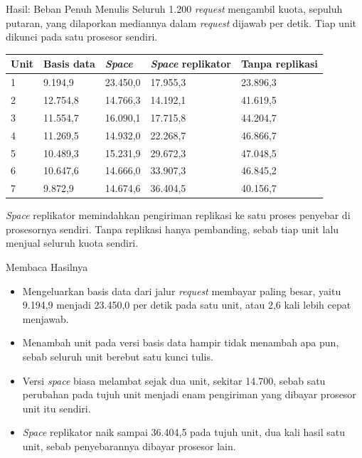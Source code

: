 \documentclass[aspectratio=169, table, 12pt]{beamer}
\begin{document}
\begin{frame}{{\Large Hasil: Beban Penuh Menulis}}
  \vspace{4pt}
  {\small Seluruh 1.200 \textit{request} mengambil kuota, sepuluh putaran, yang
  dilaporkan mediannya dalam \textit{request} dijawab per detik. Tiap unit
  dikunci pada satu prosesor sendiri.}

  \vspace{2pt}
  \centering
  \footnotesize
  \begin{tabularx}{0.96\textwidth}{|l|X|X|X|X|}
    \hline
    \textbf{Unit} & \textbf{Basis data} & \textbf{\textit{Space}} & \textbf{\textit{Space} replikator} & \textbf{Tanpa replikasi} \\
    \hline
    1 & 9.194,9 & 23.450,0 & 17.955,3 & 23.896,3 \\
    \hline
    2 & 12.754,8 & 14.766,3 & 14.192,1 & 41.619,5 \\
    \hline
    3 & 11.554,7 & 16.090,1 & 17.715,8 & 44.204,7 \\
    \hline
    4 & 11.269,5 & 14.932,0 & 22.268,7 & 46.866,7 \\
    \hline
    5 & 10.489,3 & 15.231,9 & 29.672,3 & 47.048,5 \\
    \hline
    6 & 10.647,6 & 14.666,0 & 33.907,3 & 46.845,2 \\
    \hline
    7 & 9.872,9 & 14.674,6 & 36.404,5 & 40.156,7 \\
    \hline
  \end{tabularx}

  \vspace{2pt}
  \raggedright
  {\small \textit{Space} replikator memindahkan pengiriman replikasi ke satu
  proses penyebar di prosesornya sendiri. Tanpa replikasi hanya pembanding,
  sebab tiap unit lalu menjual seluruh kuota sendiri.}
\end{frame}

\begin{frame}{{\Large Membaca Hasilnya}}
  \vspace{10pt}
  \begin{itemize}\small
    \item Mengeluarkan basis data dari jalur \textit{request} membayar paling
          besar, yaitu 9.194,9 menjadi 23.450,0 per detik pada satu unit, atau
          2,6 kali lebih cepat menjawab.
    \item Menambah unit pada versi basis data hampir tidak menambah apa pun,
          sebab seluruh unit berebut satu kunci tulis.
    \item Versi \textit{space} biasa melambat sejak dua unit, sekitar 14.700,
          sebab satu perubahan pada tujuh unit menjadi enam pengiriman yang
          dibayar prosesor unit itu sendiri.
    \item \textit{Space} replikator naik sampai 36.404,5 pada tujuh unit, dua
          kali hasil satu unit, sebab penyebarannya dibayar prosesor lain.
  \end{itemize}
\end{frame}
\end{document}
